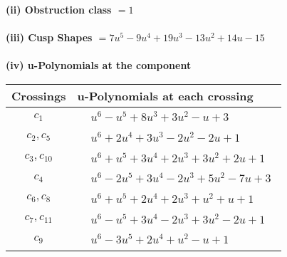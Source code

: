 \documentclass[1p]{elsarticle_modified}
\theoremstyle{definition}
\begin{document}
\flushleft \textbf{(ii) Obstruction class $= 1$}\\~\\
\flushleft \textbf{(iii) Cusp Shapes $= 7 u^5-9 u^4+19 u^3-13 u^2+14 u-15$}\\~\\
\newpage\renewcommand{\arraystretch}{1}
\flushleft \textbf{(iv) u-Polynomials at the component}\newline \\
\begin{tabular}{m{50pt}|m{274pt}}
Crossings & \hspace{64pt}u-Polynomials at each crossing \\
\hline $$\begin{aligned}c_{1}\end{aligned}$$&$\begin{aligned}
&u^6- u^5+8 u^3+3 u^2- u+3
\end{aligned}$\\
\hline $$\begin{aligned}c_{2},c_{5}\end{aligned}$$&$\begin{aligned}
&u^6+2 u^4+3 u^3-2 u^2-2 u+1
\end{aligned}$\\
\hline $$\begin{aligned}c_{3},c_{10}\end{aligned}$$&$\begin{aligned}
&u^6+u^5+3 u^4+2 u^3+3 u^2+2 u+1
\end{aligned}$\\
\hline $$\begin{aligned}c_{4}\end{aligned}$$&$\begin{aligned}
&u^6-2 u^5+3 u^4-2 u^3+5 u^2-7 u+3
\end{aligned}$\\
\hline $$\begin{aligned}c_{6},c_{8}\end{aligned}$$&$\begin{aligned}
&u^6+u^5+2 u^4+2 u^3+u^2+u+1
\end{aligned}$\\
\hline $$\begin{aligned}c_{7},c_{11}\end{aligned}$$&$\begin{aligned}
&u^6- u^5+3 u^4-2 u^3+3 u^2-2 u+1
\end{aligned}$\\
\hline $$\begin{aligned}c_{9}\end{aligned}$$&$\begin{aligned}
&u^6-3 u^5+2 u^4+u^2- u+1
\end{aligned}$\\
\hline
\end{tabular}\\~\\
\end{document}
